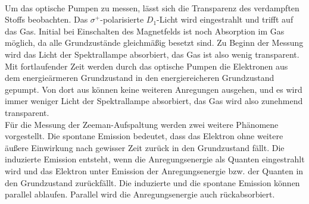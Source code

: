 %
\\Um das optische Pumpen zu messen, lässt sich die Transparenz des verdampften Stoffs beobachten.
Das $\sigma^{+}$-polarisierte $D_{1}$-Licht wird eingestrahlt und trifft auf das Gas.
Initial bei Einschalten des Magnetfelds ist noch Absorption im Gas möglich, da alle Grundzustände gleichmäßig besetzt sind.
Zu Beginn der Messung wird das Licht der Spektrallampe absorbiert, das Gas ist also wenig transparent.
Mit fortlaufender Zeit werden durch das optische Pumpen die Elektronen aus dem energieärmeren Grundzustand in den energiereicheren Grundzustand gepumpt.
Von dort aus können keine weiteren Anregungen ausgehen, und es wird immer weniger Licht der Spektrallampe absorbiert, das Gas wird also zunehmend transparent.
%
%
\\Für die Messung der Zeeman-Aufspaltung werden zwei weitere Phänomene vorgestellt.
Die spontane Emission bedeutet, dass das Elektron ohne weitere äußere Einwirkung nach gewisser Zeit zurück in den Grundzustand fällt.
Die induzierte Emission entsteht, wenn die Anregungsenergie als Quanten eingestrahlt wird und das Elektron unter Emission der Anregungsenergie bzw. der Quanten in den Grundzustand zurückfällt.
Die induzierte und die spontane Emission können parallel ablaufen.
Parallel wird die Anregungsenergie auch rückabsorbiert.
